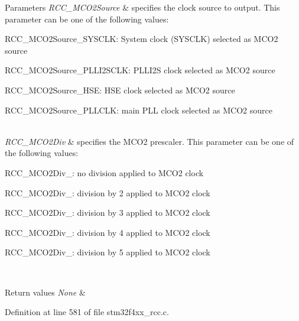 \begin{DoxyParams}{Parameters}
{\em R\+C\+C\+\_\+\+M\+C\+O2\+Source} & specifies the clock source to output. This parameter can be one of the following values\+: \begin{DoxyItemize}
\item R\+C\+C\+\_\+\+M\+C\+O2\+Source\+\_\+\+S\+Y\+S\+C\+LK\+: System clock (S\+Y\+S\+C\+LK) selected as M\+C\+O2 source \item R\+C\+C\+\_\+\+M\+C\+O2\+Source\+\_\+\+P\+L\+L\+I2\+S\+C\+LK\+: P\+L\+L\+I2S clock selected as M\+C\+O2 source \item R\+C\+C\+\_\+\+M\+C\+O2\+Source\+\_\+\+H\+SE\+: H\+SE clock selected as M\+C\+O2 source \item R\+C\+C\+\_\+\+M\+C\+O2\+Source\+\_\+\+P\+L\+L\+C\+LK\+: main P\+LL clock selected as M\+C\+O2 source \end{DoxyItemize}
\\
\hline
{\em R\+C\+C\+\_\+\+M\+C\+O2\+Div} & specifies the M\+C\+O2 prescaler. This parameter can be one of the following values\+: \begin{DoxyItemize}
\item R\+C\+C\+\_\+\+M\+C\+O2\+Div\+\_\+: no division applied to M\+C\+O2 clock \item R\+C\+C\+\_\+\+M\+C\+O2\+Div\+\_\+: division by 2 applied to M\+C\+O2 clock \item R\+C\+C\+\_\+\+M\+C\+O2\+Div\+\_\+: division by 3 applied to M\+C\+O2 clock \item R\+C\+C\+\_\+\+M\+C\+O2\+Div\+\_\+: division by 4 applied to M\+C\+O2 clock \item R\+C\+C\+\_\+\+M\+C\+O2\+Div\+\_\+: division by 5 applied to M\+C\+O2 clock \end{DoxyItemize}
\\
\hline
\end{DoxyParams}

\begin{DoxyRetVals}{Return values}
{\em None} & \\
\hline
\end{DoxyRetVals}


Definition at line 581 of file stm32f4xx\+\_\+rcc.\+c.

\mbox{\label{group___r_c_c_ga448137346d4292985d4e7a61dd1a824f}} 
